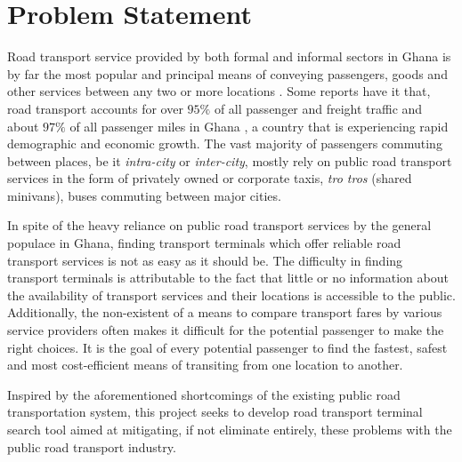 \section{Problem Statement}
Road transport service provided by both formal and informal sectors in Ghana is by far the most popular and principal means of conveying passengers, goods and other services between any two or more locations \citep{aidoo_passengers_2013}. Some reports have it that, road transport accounts for over $ 95\% $ of all passenger and freight traffic and about $ 97\% $ of all passenger miles in Ghana \citep{unesco_transportation:_????}, a country that is experiencing rapid demographic and economic growth. The vast majority of passengers commuting between places, be it \textit{intra-city} or \textit{inter-city}, mostly rely on public road transport services in the form of privately owned or corporate taxis, \textit{tro tros} (shared minivans), buses commuting between major cities.

In spite of the heavy reliance on public road transport services by the general populace in Ghana, finding transport terminals which offer reliable road transport services is not as easy as it should be. The difficulty in finding transport terminals is attributable to the fact that little or no information about the availability of transport services and their locations is accessible to the public. Additionally, the non-existent of a means to compare transport fares by various service providers often makes it difficult for the potential passenger to make the right choices. It is the goal of every potential passenger to find the fastest, safest and most cost-efficient means of transiting from one location to another. 

Inspired by the aforementioned shortcomings of the existing public road transportation system, this project seeks to develop road transport terminal search tool
aimed at mitigating, if not eliminate entirely, these problems with the public road transport industry.

